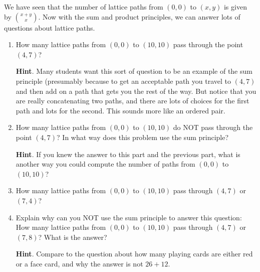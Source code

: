 \documentclass{book}
\begin{document}
\setcounter{cpjt}{85}
\addtocounter{cpjt}{-1}
\begin{activity}\label{act-latticepaths2}
\hypertarget{p-624}{}%
We have seen that the number of lattice paths from \((0,0)\) to \((x,y)\) is given by \(\binom{x+y}{x}\).  Now with the sum and product principles, we can answer lots of questions about lattice paths.%
\begin{enumerate}[font=\bfseries,label=(\alph*),ref=\alph*]
\item\label{task-127} \hypertarget{p-625}{}%
How many lattice paths from \((0,0)\) to \((10,10)\) pass through the point \((4,7)\)?%
\par\smallskip%
\noindent\textbf{Hint}.\hypertarget{hint-37}{}\quad%
\hypertarget{p-626}{}%
Many students want this sort of question to be an example of the sum principle (presumably because to get an acceptable path you travel to \((4,7)\) and then add on a path that gets you the rest of the way.  But notice that you are really concatenating two paths, and there are lots of choices for the first path and lots for the second.  This sounds more like an ordered pair.%
\item\label{task-128} \hypertarget{p-627}{}%
How many lattice paths from \((0,0)\) to \((10,10)\) do NOT pass through the point \((4,7)\)?  In what way does this problem use the sum principle?%
\par\smallskip%
\noindent\textbf{Hint}.\hypertarget{hint-38}{}\quad%
\hypertarget{p-628}{}%
If you knew the answer to this part and the previous part, what is another way you could compute the number of paths from \((0,0)\) to \((10,10)\)?%
\item\label{task-129} \hypertarget{p-629}{}%
How many lattice paths from \((0,0)\) to \((10,10)\) pass through \((4,7)\) or \((7,4)\)?%
\item\label{task-130} \hypertarget{p-630}{}%
Explain why can you NOT use the sum principle to answer this question: How many lattice paths from \((0,0)\) to \((10,10)\) pass through \((4,7)\) or \((7,8)\)?  What is the answer?%
\par\smallskip%
\noindent\textbf{Hint}.\hypertarget{hint-39}{}\quad%
\hypertarget{p-631}{}%
Compare to the question about how many playing cards are either red or a face card, and why the answer is not \(26 + 12\).%
\end{enumerate}
\end{activity}

\clearpage
\end{document}
